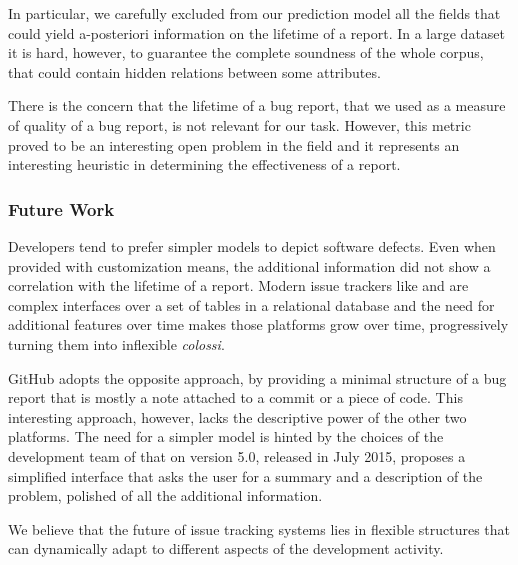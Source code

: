 In particular, we carefully excluded from our prediction model all the fields that could yield a-posteriori information on the lifetime of a report.
In a large dataset it is hard, however, to guarantee the complete soundness of the whole corpus, that could contain hidden relations between some attributes.

There is the concern that the lifetime of a bug report, that we used as a measure of quality of a bug report, is not relevant for our task.
However, this metric proved to be an interesting open problem in the field and it represents an interesting heuristic in determining the effectiveness of a report.


\subsubsection{Future Work}

Developers tend to prefer simpler models to depict software defects.
Even when provided with customization means, the additional information did not show a correlation with the lifetime of a report.
Modern issue trackers like \jira and \bzilla are complex interfaces over a set of tables in a relational database and the need for additional features over time makes those platforms grow over time, progressively turning them into inflexible \emph{colossi}.

GitHub adopts the opposite approach, by providing a minimal structure of a bug report that is mostly a note attached to a commit or a piece of code.
This interesting approach, however, lacks the descriptive power of the other two platforms.
The need for a simpler model is hinted by the choices of the development team of \bzilla that on version 5.0, released in July 2015, proposes a simplified interface that asks the user for a summary and a description of the problem, polished of all the additional information.

We believe that the future of issue tracking systems lies in flexible structures that can dynamically adapt to different aspects of the development activity.


